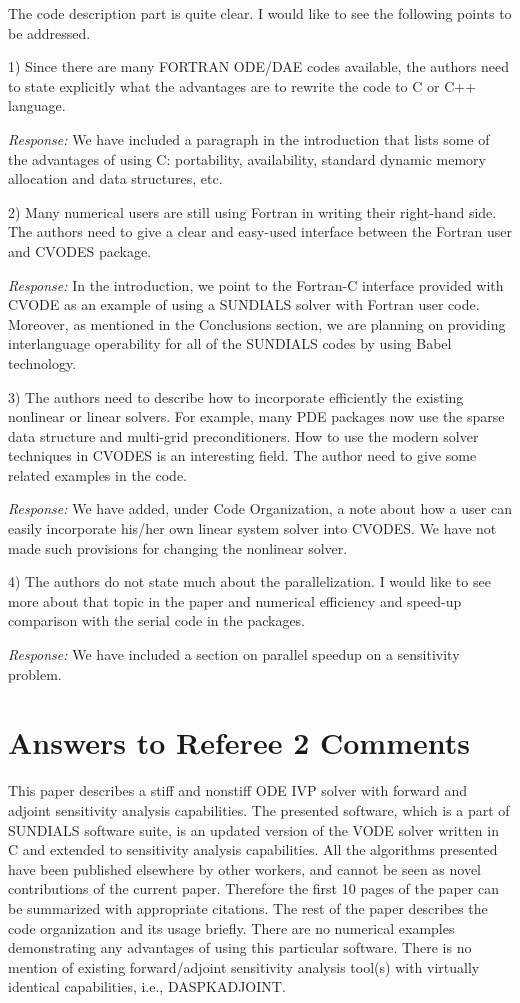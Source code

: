 The code description part is quite clear. I would like to see
the following points to be addressed. 

1) Since there are many FORTRAN ODE/DAE codes available, the authors need to 
state explicitly what the advantages are to rewrite the code to C or C++
language. 

{\em Response:}
We have included a paragraph in the introduction that lists
some of the advantages of using C: portability, availability, standard
dynamic memory allocation and data structures, etc.

2) Many numerical users are still using Fortran in writing their right-hand 
side. The authors need to give a clear and easy-used interface between the 
Fortran user and CVODES package. 

{\em Response:}
In the introduction, we point to the Fortran-C interface provided
with CVODE as an example of using a SUNDIALS solver with Fortran user code.
Moreover, as mentioned in the Conclusions section, we are planning on
providing interlanguage operability for all of the SUNDIALS codes by using
Babel technology.

3) The authors need to describe how to incorporate efficiently the existing 
nonlinear or linear solvers. For example, many PDE packages now use the sparse 
data structure and multi-grid preconditioners. How to use the modern solver
techniques  in CVODES is an interesting field. The author need
to give some related examples in the code. 

{\em Response:}
We have added, under Code Organization, a note about how a user can
easily incorporate his/her own linear system solver into CVODES.  We
have not made such provisions for changing the nonlinear solver.

4) The authors do not state much about the parallelization. I would like to 
see more about that topic in the paper and numerical efficiency and speed-up
comparison with the serial code in the packages.

{\em Response:}
We have included a section on parallel speedup on a sensitivity problem.


\newpage
\section{Answers to Referee 2 Comments}

This paper describes a stiff and nonstiff ODE IVP solver with forward
and adjoint sensitivity analysis capabilities. The presented software,
which is a part of SUNDIALS software suite, is an updated version of
the VODE solver written in C and extended to sensitivity analysis
capabilities.  All the algorithms presented have been published
elsewhere by other workers, and cannot be seen as novel contributions
of the current paper. Therefore the first 10 pages of the paper can be
summarized with appropriate citations. The rest of the paper describes
the code organization and its usage briefly. There are no numerical
examples demonstrating any advantages of using this particular
software. There is no mention of existing forward/adjoint sensitivity
analysis tool(s) with virtually identical capabilities, i.e.,
DASPKADJOINT.

